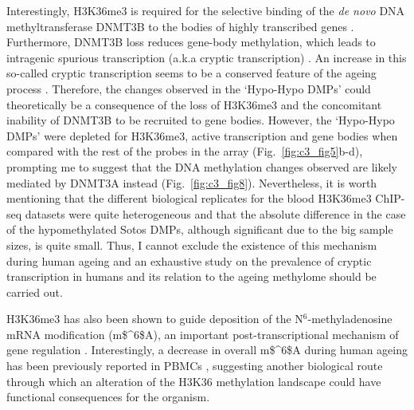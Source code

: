 \bigskip

Interestingly, H3K36me3 is required for the selective binding of the \textit{de novo} DNA methyltransferase DNMT3B to the bodies of highly transcribed genes \citep{Baubec2015}. Furthermore, DNMT3B loss reduces gene-body methylation, which leads to intragenic spurious transcription (a.k.a cryptic transcription) \citep{Neri2017}. An increase in this so-called cryptic transcription seems to be a conserved feature of the ageing process \citep{Sen2015}. Therefore, the changes observed in the `Hypo-Hypo DMPs' could theoretically be a consequence of the loss of H3K36me3 and the concomitant inability of DNMT3B to be recruited to gene bodies. However, the `Hypo-Hypo DMPs' were depleted for H3K36me3, active transcription and gene bodies when compared with the rest of the probes in the array (Fig.~\ref{fig:c3_fig5}b-d), prompting me to suggest that the DNA methylation changes observed are likely mediated by DNMT3A instead (Fig.~\ref{fig:c3_fig8}). Nevertheless, it is worth mentioning that the different biological replicates for the blood H3K36me3 ChIP-seq datasets were quite heterogeneous and that the absolute difference in the case of the hypomethylated Sotos DMPs, although significant due to the big sample sizes, is quite small. Thus, I cannot exclude the existence of this mechanism during human ageing and an exhaustive study on the prevalence of cryptic transcription in humans and its relation to the ageing methylome should be carried out.

\bigskip

H3K36me3 has also been shown to guide deposition of the N$^6$-methyladenosine \acrshort{mRNA} modification (\acrshort{m$^6$A}), an important post-transcriptional mechanism of gene regulation \citep{Huang2019}. Interestingly, a decrease in overall \acrshort{m$^6$A} during human ageing has been previously reported in \acrshort{PBMC}s \citep{Min2018}, suggesting another biological route through which an alteration of the H3K36 methylation landscape could have functional consequences for the organism.

\bigskip

